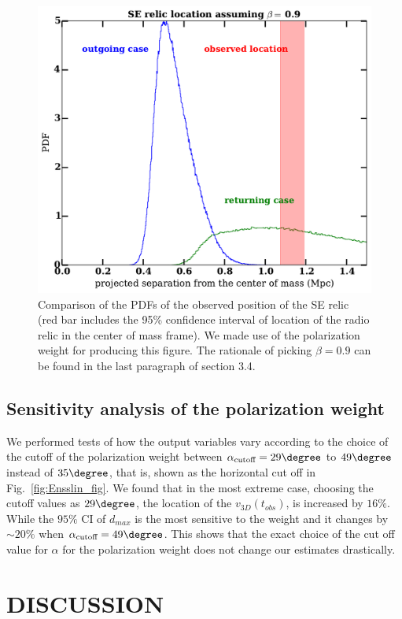 \documentclass[letterpaper,useAMS,usenatbib]{mn2e}
\begin{document}
\begin{figure}
	\includegraphics[width=\linewidth]{our_guess_SE.pdf}
	\caption{Comparison of the PDFs of the observed position of the SE relic (red bar
	includes the 95\% confidence interval of location of the radio relic in
the center of mass frame). We made use of the polarization weight for
producing this figure. The
rationale of picking $\beta = 0.9$ can be found in the last paragraph of
section 3.4. 
}
	\label{fig:our_guessed_scenario1}
\end{figure}
\subsection{Sensitivity analysis of the polarization weight}
\label{sec:sensitivityTests}
We performed tests of how the output variables vary according to the
choice of the cutoff of the polarization weight between
$\alpha_{\text{cutoff}} =
29 \degree$ to $49\degree$ instead of $35 \degree$, that is, shown as the
horizontal cut off in Fig.~\ref{fig:Ensslin_fig}.
We found that in the most extreme case, choosing the cutoff values as $29
\degree$, the location of the $v_{3D}(t_{obs})$, is
increased by $16 \%$. While the $95\%$ CI of $d_{max}$ is
the most sensitive to the weight and it changes by
$\sim20 \%$ when $\alpha_{\text{cutoff}} = 49 \degree$. 
This shows that the exact choice of the cut off value for $\alpha$ for the
polarization weight does not change our estimates drastically.


\section{DISCUSSION}
\end{document}
